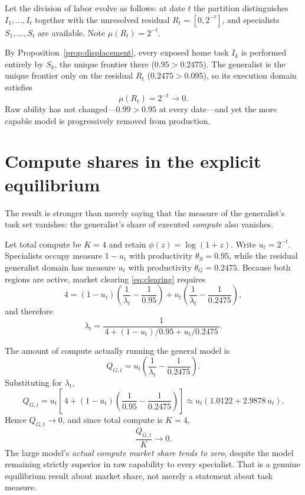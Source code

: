 \documentclass[11pt]{article}
\theoremstyle{definition}
\theoremstyle{remark}
\begin{document}
Let the division of labor evolve as follows: at date $t$ the partition distinguishes $I_1, \ldots, I_t$ together with the unresolved residual $R_t = [0, 2^{-t}]$, and specialists $S_1, \ldots, S_t$ are available. Note $\mu(R_t) = 2^{-t}$.

By Proposition~\ref{prop:displacement}, every exposed home task $I_k$ is performed entirely by $S_k$, the unique frontier there ($0.95 > 0.2475$). The generalist is the unique frontier only on the residual $R_t$ ($0.2475 > 0.095$), so its execution domain satisfies
\begin{equation}
\mu(R_t) = 2^{-t} \longrightarrow 0.
\end{equation}
Raw ability has not changed---$0.99 > 0.95$ at every date---and yet the more capable model is progressively removed from production.

\section{Compute shares in the explicit equilibrium}
\label{sec:shares}

The result is stronger than merely saying that the measure of the generalist's task set vanishes: the generalist's share of executed \emph{compute} also vanishes.

Let total compute be $K = 4$ and retain $\phi(z) = \log(1+z)$. Write $u_t = 2^{-t}$. Specialists occupy measure $1 - u_t$ with productivity $\theta_S = 0.95$, while the residual generalist domain has measure $u_t$ with productivity $\theta_G = 0.2475$. Because both regions are active, market clearing \eqref{eq:clearing} requires
\begin{equation}
4 = (1 - u_t) \left( \frac{1}{\lambda_t} - \frac{1}{0.95} \right)
  + u_t \left( \frac{1}{\lambda_t} - \frac{1}{0.2475} \right),
\end{equation}
and therefore
\begin{equation}
\lambda_t = \frac{1}{\,4 + (1-u_t)/0.95 + u_t/0.2475\,}.
\end{equation}

The amount of compute actually running the general model is
\begin{equation}
Q_{G,t} = u_t \left( \frac{1}{\lambda_t} - \frac{1}{0.2475} \right).
\end{equation}
Substituting for $\lambda_t$,
\begin{equation}
Q_{G,t}
= u_t \left[\, 4 + (1 - u_t) \left( \frac{1}{0.95} - \frac{1}{0.2475} \right) \right]
\approx u_t \left( 1.0122 + 2.9878\, u_t \right).
\end{equation}
Hence $Q_{G,t} \longrightarrow 0$, and since total compute is $K = 4$,
\begin{equation}
\frac{Q_{G,t}}{K} \longrightarrow 0.
\end{equation}
The large model's \emph{actual compute market share tends to zero}, despite the model remaining strictly superior in raw capability to every specialist. That is a genuine equilibrium result about market share, not merely a statement about task measure.
\end{document}
